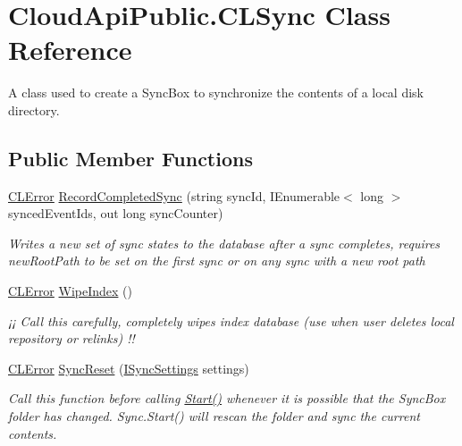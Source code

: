 \hypertarget{class_cloud_api_public_1_1_c_l_sync}{\section{Cloud\-Api\-Public.\-C\-L\-Sync Class Reference}
\label{class_cloud_api_public_1_1_c_l_sync}
}


A class used to create a Sync\-Box to synchronize the contents of a local disk directory.  


\subsection*{Public Member Functions}
\begin{DoxyCompactItemize}
\item 
\hyperlink{class_cloud_api_public_1_1_model_1_1_c_l_error}{C\-L\-Error} \hyperlink{class_cloud_api_public_1_1_c_l_sync_ae42abebf3134701ec50ea49002eb8291}{Record\-Completed\-Sync} (string sync\-Id, I\-Enumerable$<$ long $>$ synced\-Event\-Ids, out long sync\-Counter)
\begin{DoxyCompactList}\small\item\em Writes a new set of sync states to the database after a sync completes, requires new\-Root\-Path to be set on the first sync or on any sync with a new root path \end{DoxyCompactList}\item 
\hyperlink{class_cloud_api_public_1_1_model_1_1_c_l_error}{C\-L\-Error} \hyperlink{class_cloud_api_public_1_1_c_l_sync_a3bbf0e1f002b7cedd12e16562c071dce}{Wipe\-Index} ()
\begin{DoxyCompactList}\small\item\em ¡¡ Call this carefully, completely wipes index database (use when user deletes local repository or relinks) !! \end{DoxyCompactList}\item 
\hyperlink{class_cloud_api_public_1_1_model_1_1_c_l_error}{C\-L\-Error} \hyperlink{class_cloud_api_public_1_1_c_l_sync_a81d09690e5f271bf5cb75f86a855e201}{Sync\-Reset} (\hyperlink{interface_cloud_api_public_1_1_interfaces_1_1_i_sync_settings}{I\-Sync\-Settings} settings)
\begin{DoxyCompactList}\small\item\em Call this function before calling \hyperlink{class_cloud_api_public_1_1_c_l_sync_a1b700631eb605ad6e065dc4296fcb912}{Start()} whenever it is possible that the Sync\-Box folder has changed. Sync.\-Start() will rescan the folder and sync the current contents. \end{DoxyCompactList}\item 

\end{DoxyCompactItemize}
